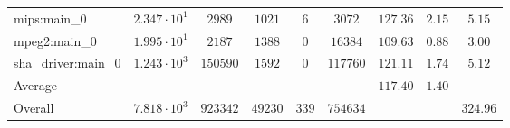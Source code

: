 \begin{tabular}{|l|c|c|c|c|c|c|c|c|}
mips:main\_0            & $ 2.347 \cdot 10^{1} $ & $ 2989   $ & $ 1021  $ & $ 6   $ & $ 3072   $ & $ 127.36      $ & $ 2.15    $ & $ 5.15    $ \\
mpeg2:main\_0           & $ 1.995 \cdot 10^{1} $ & $ 2187   $ & $ 1388  $ & $ 0   $ & $ 16384  $ & $ 109.63      $ & $ 0.88    $ & $ 3.00    $ \\
sha\_driver:main\_0     & $ 1.243 \cdot 10^{3} $ & $ 150590 $ & $ 1592  $ & $ 0   $ & $ 117760 $ & $ 121.11      $ & $ 1.74    $ & $ 5.12    $ \\
\hline
Average                 & $                    $ & $        $ & $       $ & $     $ & $        $ & $ 117.40      $ & $ 1.40    $ & $         $ \\
\hline
Overall                 & $ 7.818 \cdot 10^{3} $ & $ 923342 $ & $ 49230 $ & $ 339 $ & $ 754634 $ & $             $ & $         $ & $ 324.96  $ \\
\hline
\end{tabular}
